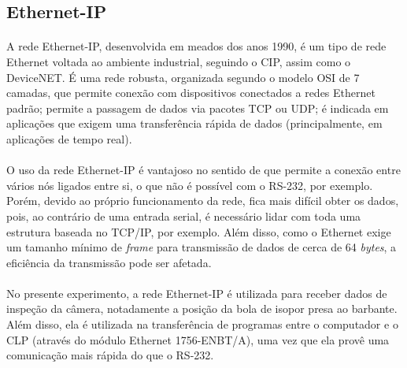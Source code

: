 \subsection{Ethernet-IP}
\paragraph{}A rede Ethernet-IP, desenvolvida em meados dos anos 1990, é um tipo de rede Ethernet voltada ao ambiente industrial, seguindo o CIP, assim como o DeviceNET. É uma rede robusta, organizada segundo o modelo OSI de 7 camadas, que permite conexão com dispositivos conectados a redes Ethernet padrão; permite a passagem de dados via pacotes TCP ou UDP; é indicada em aplicações que exigem uma transferência rápida de dados (principalmente, em aplicações de tempo real).
\paragraph{}O uso da rede Ethernet-IP é vantajoso no sentido de que permite a conexão entre vários nós ligados entre si, o que não é possível com o RS-232, por exemplo. Porém, devido ao próprio funcionamento da rede, fica mais difícil obter os dados, pois, ao contrário de uma entrada serial, é necessário lidar com toda uma estrutura baseada no TCP/IP, por exemplo. Além disso, como o Ethernet exige um tamanho mínimo de \textit{frame} para transmissão de dados de cerca de 64 \textit{bytes}, a eficiência da transmissão pode ser afetada.
\paragraph{}No presente experimento, a rede Ethernet-IP é utilizada para receber dados de inspeção da câmera, notadamente a posição da bola de isopor presa ao barbante. Além disso, ela é utilizada na transferência de programas entre o computador e o CLP (através do módulo Ethernet 1756-ENBT/A), uma vez que ela provê uma comunicação mais rápida do que o RS-232.

\begin{comment}
https://en.wikipedia.org/wiki/Industrial_Ethernet
https://en.wikipedia.org/wiki/EtherNet/IP
https://www.odva.org/Technology-Standards/EtherNet-IP/Overview
http://www.rtaautomation.com/technologies/ethernetip/
http://www.rockwellautomation.com/global/products-technologies/integrated-architecture/ethernet-ip.page
http://www.rtaautomation.com/technologies/ethernetip/
\end{comment}

